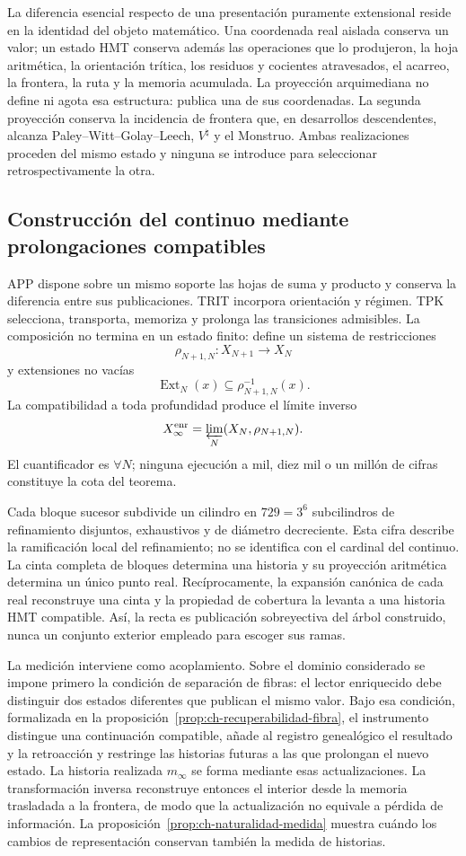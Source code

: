 La diferencia esencial respecto de una presentación puramente extensional
reside en la identidad del objeto matemático. Una coordenada real aislada
conserva un valor; un estado HMT conserva además las operaciones que lo
produjeron, la hoja aritmética, la orientación trítica, los residuos y
cocientes atravesados, el acarreo, la frontera, la ruta y la memoria acumulada.
La proyección arquimediana no define ni agota esa estructura: publica una de
sus coordenadas. La segunda proyección conserva la incidencia de frontera que,
en desarrollos descendentes, alcanza Paley--Witt--Golay--Leech,
\(V^\natural\) y el Monstruo. Ambas realizaciones proceden del mismo estado y
ninguna se introduce para seleccionar retrospectivamente la otra.

\subsection{Construcción del continuo mediante prolongaciones compatibles}

APP dispone sobre un mismo soporte las hojas de suma y producto y conserva la
diferencia entre sus publicaciones. TRIT incorpora orientación y régimen. TPK
selecciona, transporta, memoriza y prolonga las transiciones admisibles. La
composición no termina en un estado finito: define un sistema de restricciones
\[
 \rho_{N+1,N}:X_{N+1}\longrightarrow X_N
\]
y extensiones no vacías
\[
 \operatorname{Ext}_N(x)\subseteq\rho_{N+1,N}^{-1}(x).
\]
La compatibilidad a toda profundidad produce el límite inverso
\[
 X_\infty^{\mathrm{enr}}
 =\varprojlim_N(X_N,\rho_{N+1,N}).
\]
El cuantificador es \(\forall N\); ninguna ejecución a mil, diez mil o un
millón de cifras constituye la cota del teorema.

Cada bloque sucesor subdivide un cilindro en \(729=3^6\) subcilindros de refinamiento disjuntos,
exhaustivos y de diámetro decreciente. Esta cifra describe la ramificación
local del refinamiento; no se identifica con el cardinal del continuo. La
cinta completa de bloques determina una historia y su proyección aritmética
determina un único punto real. Recíprocamente, la expansión canónica de cada
real reconstruye una cinta y la propiedad de cobertura la levanta a una
historia HMT compatible. Así, la recta es publicación sobreyectiva del árbol
construido, nunca un conjunto exterior empleado para escoger sus ramas.

La medición interviene como acoplamiento. Sobre el dominio considerado se
impone primero la condición de separación de fibras: el lector enriquecido
debe distinguir dos estados diferentes que publican el mismo valor. Bajo esa
condición, formalizada en la
proposición~\ref{prop:ch-recuperabilidad-fibra}, el instrumento distingue una
continuación compatible, añade al registro genealógico el resultado y la
retroacción y restringe las historias futuras a las que prolongan el nuevo
estado. La historia realizada \(m_\infty\) se forma mediante esas
actualizaciones. La transformación inversa reconstruye entonces el interior
desde la memoria trasladada a la frontera, de modo que la actualización no
equivale a pérdida de información. La
proposición~\ref{prop:ch-naturalidad-medida} muestra cuándo los cambios de
representación conservan también la medida de historias.

